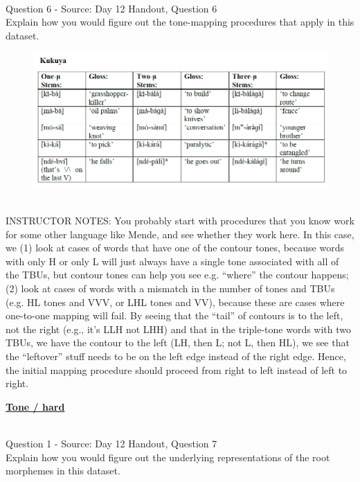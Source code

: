 \documentclass[12pt]{article}
\begin{document}
~\\

{\large Question 6} - Source: Day 12 Handout, Question 6\\

Explain how you would figure out the tone-mapping procedures that apply in this dataset.\\

\begin{figure}[H]
\includegraphics{../images/kukuya.png}
\end{figure}

~\\
INSTRUCTOR NOTES: You probably start with procedures that you know work for some other language like Mende, and see whether they work here. In this case, we (1) look at cases of words that have one of the contour tones, because words with only H or only L will just always have a single tone associated with all of the TBUs, but contour tones can help you see e.g. “where” the contour happens; (2) look at cases of words with a mismatch in the number of tones and TBUs (e.g. HL tones and VVV, or LHL tones and VV), because these are cases where one-to-one mapping will fail. By seeing that the “tail” of contours is to the left, not the right (e.g., it’s LLH not LHH) and that in the triple-tone words with two TBUs, we have the contour to the left (LH, then L; not L, then HL), we see that the “leftover” stuff needs to be on the left edge instead of the right edge. Hence, the initial mapping procedure should proceed from right to left instead of left to right.


\newpage\textbf{\underline{\huge Tone / hard\\}}

~\\

{\large Question 1} - Source: Day 12 Handout, Question 7\\

Explain how you would figure out the underlying representations of the root morphemes in this dataset.\\
\end{document}
